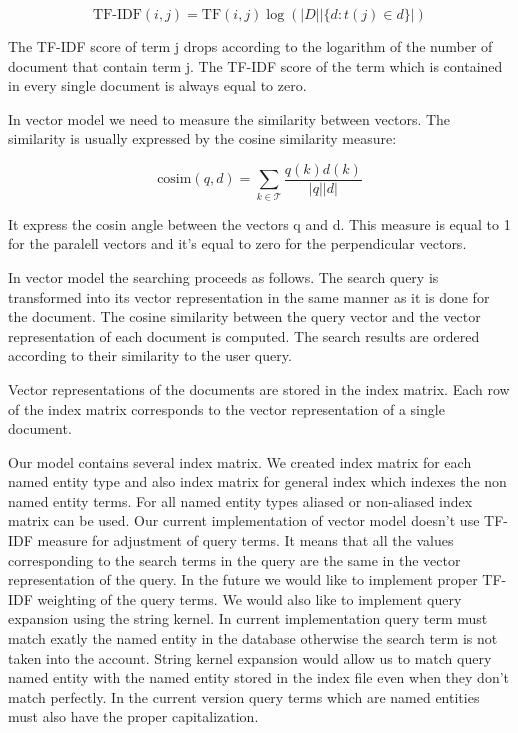 \[\text{TF-IDF}(i,j) = \text{TF}(i,j)\log{(|D| |\lbrace d : t(j) \in d \rbrace|)}\]

The TF-IDF score of term j drops according to the logarithm of the number of document that contain term j. The TF-IDF score of the term which is contained in every single document is always equal to zero.


In vector model we need to measure the similarity between vectors. The similarity is usually expressed by the cosine similarity measure:

\[\text{cosim}(q,d) = \sum_{k \in \mathcal{T}}\frac{q(k)d(k)}{|q||d|}\]

It express the cosin angle between the vectors q and d. This measure is equal to 1 for the paralell vectors and it's equal to zero for the perpendicular vectors.

In vector model the searching proceeds as follows. The search query is transformed into its vector representation in the same manner as it is done for the document. The cosine similarity between the query vector and the vector representation of each document is computed. The search results are ordered according to their similarity to the user query.  

Vector representations of the documents are stored in the index matrix. Each row of the index matrix corresponds to the vector representation of a single document. 

Our model contains several index matrix. We created index matrix for each named entity type and also index matrix for general index which indexes the non named entity terms. For all named entity types aliased or non-aliased index matrix can be used. Our current implementation of vector model doesn't use TF-IDF measure for adjustment of query terms. It means that all the values corresponding to the search terms in the query are the same in the vector representation of the query. In the future we would like to implement proper TF-IDF weighting of the query terms. We would also like to implement query expansion using the string kernel. In current implementation query term must match exatly the named entity in the database otherwise the search term is not taken into the account. String kernel expansion would allow us to match query named entity with the named entity stored in the index file even when they don't match perfectly. In the current version query terms which are named entities must also have the proper capitalization.

